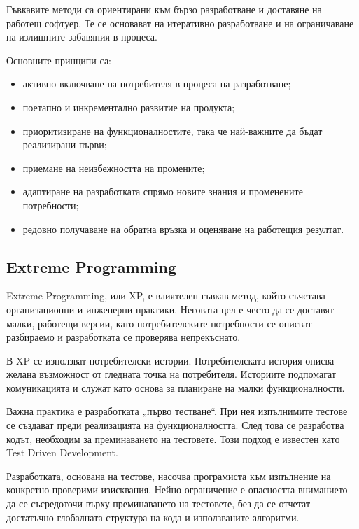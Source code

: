 \begin{defn}
Гъвкавите методи са ориентирани към бързо разработване и доставяне на работещ софтуер. Те се основават на итеративно разработване и на ограничаване на излишните забавяния в процеса.
\end{defn}

Основните принципи са:

\begin{itemize}
    \item активно включване на потребителя в процеса на разработване;
    \item поетапно и инкрементално развитие на продукта;
    \item приоритизиране на функционалностите, така че най-важните да бъдат реализирани първи;
    \item приемане на неизбежността на промените;
    \item адаптиране на разработката спрямо новите знания и променените потребности;
    \item редовно получаване на обратна връзка и оценяване на работещия резултат.
\end{itemize}

\subsection{Extreme Programming}\label{s:26.4.1}

\begin{defn}
Extreme Programming, или XP, е влиятелен гъвкав метод, който съчетава организационни и инженерни практики. Неговата цел е често да се доставят малки, работещи версии, като потребителските потребности се описват разбираемо и разработката се проверява непрекъснато.
\end{defn}

В XP се използват потребителски истории. Потребителската история описва желана възможност от гледната точка на потребителя. Историите подпомагат комуникацията и служат като основа за планиране на малки функционалности.

Важна практика е разработката „първо тестване“. При нея изпълнимите тестове се създават преди реализацията на функционалността. След това се разработва кодът, необходим за преминаването на тестовете. Този подход е известен като Test Driven Development.

\begin{remark}
Разработката, основана на тестове, насочва програмиста към изпълнение на конкретно проверими изисквания. Нейно ограничение е опасността вниманието да се съсредоточи върху преминаването на тестовете, без да се отчетат достатъчно глобалната структура на кода и използваните алгоритми.
\end{remark}

